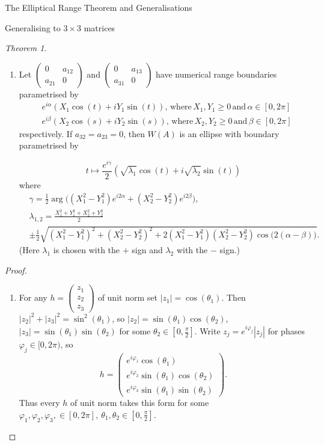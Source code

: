 \documentclass[12pt]{article}
\theoremstyle{plain}
\theoremstyle{definition}
\theoremstyle{remark}
\renewcommand{\phi}{\varphi}
\newtheorem{Theorem}{Theorem}[section]
\numberwithin{equation}{section}
\begin{document}
\begin{section}{The Elliptical Range Theorem and Generalisations}
\begin{subsection}{Generalising to $3 \times 3$ matrices}
\begin{Theorem}
\begin{enumerate}
\item Let $\begin{pmatrix}
    0 & a_{12} \\
    a_{21} & 0 
\end{pmatrix}$ and $\begin{pmatrix}
    0 & a_{13} \\
    a_{31} & 0 
\end{pmatrix}$ have numerical range boundaries parametrised by 
$$
\begin{aligned}
    &e^{i \alpha}(X_1\cos(t) + iY_1 \sin(t)), \,  \text{where}  \, X_1,Y_1 \geq 0 \, \text{and} \, \alpha \in [0, 2 \pi] \\
    &e^{i \beta}(X_2 \cos(s) + i Y_2 \sin(s)), \,  \text{where}  \, X_2,Y_2 \geq 0 \, \text{and} \, \beta \in [0, 2 \pi]
\end{aligned}
$$
respectively. If $a_{32} = a_{23}=0$, then $W(A)$ is an ellipse with boundary parametrised by

$$
t \mapsto \frac{e^{i \gamma}}{2}\left(\sqrt{\lambda_1} \cos (t) + i \sqrt{\lambda_2}\sin (t)\right)
$$
where
\[
\begin{aligned}
&\gamma = \frac12 \arg\Big( (X_1^2-Y_1^2)e^{i2\alpha} + (X_2^2-Y_2^2)e^{i2\beta} \Big),\\
&\lambda_{1,2} = \frac{X_1^2 + Y_1^2 + X_2^2 + Y_2^2}{2} \; \\
&\pm \frac{1}{2}\sqrt{(X_1^2-Y_1^2)^2 + (X_2^2-Y_2^2)^2 + 2(X_1^2-Y_1^2)(X_2^2-Y_2^2)\cos\big(2(\alpha-\beta)\big)}.
\end{aligned}
\]
(Here $\lambda_1$ is chosen with the $+$ sign and $\lambda_2$ with the $-$ sign.)
\end{enumerate} 

\end{Theorem}
\begin{proof}


\begin{enumerate}
    \item 


For any $h = \begin{pmatrix}
    z_1 \\
    z_2 \\
    z_3
\end{pmatrix}$ of unit norm set $|z_1|=\cos (\theta_1)$. Then $|z_2|^2 + |z_3|^2 = \sin^2(\theta_1)$, so $|z_2|=\sin (\theta_1)\cos (\theta_2)$, $|z_3|=\sin (\theta_1)\sin (\theta_2)$ 
for some $\theta_2 \in[0,\tfrac{\pi}{2}]$. Write $z_j = e^{i\phi_j}|z_j|$ for phases $\phi_j\in[0,2\pi)$, 
so
\[
h=
\begin{pmatrix}
e^{i\phi_1}\cos (\theta_1) \\
e^{i\phi_2}\sin (\theta_1)\cos (\theta_2) \\
e^{i\phi_3}\sin (\theta_1)\sin (\theta_2)
\end{pmatrix}.
\]
Thus every $h$ of unit norm takes this form for some $\phi_1, \phi_2, \phi_3, \in [0, 2 \pi], \ \theta_1, \theta_2 \in [0, \frac{\pi}{2} ]$.



\end{enumerate}
\end{proof}
\end{subsection}
\end{section}
\end{document}

